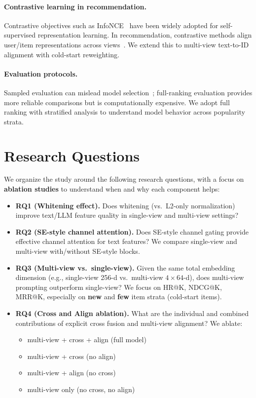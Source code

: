 \documentclass[sigconf,natbib=true]{acmart}
\newcommand{\llm}{\textsc{LLM}\xspace}
\newcommand{\InfoNCE}{InfoNCE\xspace}
\begin{document}
\paragraph{Contrastive learning in recommendation.}
Contrastive objectives such as \InfoNCE~\cite{oord2018cpc}
have been widely adopted for self-supervised representation
learning. In recommendation, contrastive methods align
user/item representations across views~\cite{wu2021cl4rec}.
We extend this to multi-view text-to-ID alignment with
cold-start reweighting.

\paragraph{Evaluation protocols.}
Sampled evaluation can mislead model
selection~\cite{krichene2020sampledmetrics}; full-ranking
evaluation provides more reliable comparisons but is
computationally expensive. We adopt full ranking with
stratified analysis to understand model behavior across
popularity strata.

\section{Research Questions}
We organize the study around the following research questions,
with a focus on \textbf{ablation studies} to understand when
and why each component helps:

\begin{itemize}[leftmargin=*,itemsep=3pt]
  \item \textbf{RQ1 (Whitening effect).}
    Does whitening (vs.\ L2-only normalization) improve
    text/\llm feature quality in single-view and multi-view
    settings?
  
  \item \textbf{RQ2 (SE-style channel attention).}
    Does SE-style channel gating provide effective channel attention for
    text features? We compare single-view and multi-view
    with/without SE-style blocks.
  
  \item \textbf{RQ3 (Multi-view vs.\ single-view).}
    Given the same total embedding dimension (e.g.,
    single-view 256-d vs.\ multi-view $4\times 64$-d), does
    multi-view prompting outperform single-view? We focus on
    HR@K, NDCG@K, MRR@K, especially on \textbf{new} and
    \textbf{few} item strata (cold-start items).
  
  \item \textbf{RQ4 (Cross and Align ablation).}
    What are the individual and combined contributions of
    explicit cross fusion and multi-view alignment? We ablate:
  \begin{itemize}[leftmargin=*,itemsep=1pt]
    \item multi-view + cross + align (full model)
    \item multi-view + cross (no align)
    \item multi-view + align (no cross)
    \item multi-view only (no cross, no align)
  \end{itemize}
\end{itemize}
\end{document}
